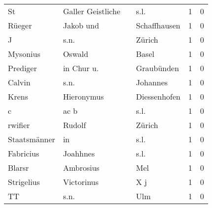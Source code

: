 \begin{tabular}{llllrr}
                       St &                  Galler Geistliche &             &                                        s.l. &          1 &         0 \\
                   Rüeger &                          Jakob und &             &                                Schaffhausen &          1 &         0 \\
                        J &                               s.n. &             &                                      Zürich &          1 &         0 \\
                 Mysonius &                             Oswald &             &                                       Basel &          1 &         0 \\
                 Prediger &                         in Chur u. &             &                                  Graubünden &          1 &         0 \\
                   Calvin &                               s.n. &             &                                    Johannes &          1 &         0 \\
                    Krens &                         Hieronymus &             &                                Diessenhofen &          1 &         0 \\
                        c &                               ac b &             &                                        s.l. &          1 &         0 \\
                  rwifier &                             Rudolf &             &                                      Zürich &          1 &         0 \\
             Staatsmänner &                                 in &             &                                        s.l. &          1 &         0 \\
                Fabricius &                           Joahhnes &             &                                        s.l. &          1 &         0 \\
                   Blarsr &                          Ambrosius &             &                                         Mel &          1 &         0 \\
               Strigelius &                         Victorinus &             &                                         X j &          1 &         0 \\
                       TT &                               s.n. &             &                                         Ulm &          1 &         0 \\

\end{tabular}
